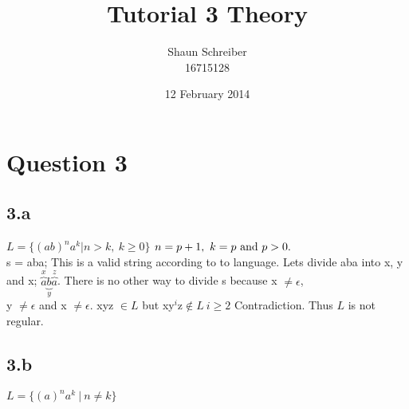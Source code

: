 \documentclass[a4paper, 12pt]{article}
\date{12 February 2014}
\author{Shaun Schreiber \\ 16715128}
\title{Tutorial 3 Theory}
\begin{document}
\maketitle

\section*{Question 3}
\subsection*{3.a}
$L = \{(ab)^{n}a^{k}| n > k,\ k\geq 0\}$
$\\ n = p + 1,\ k = p\ \mbox{and}\ p > 0.$\\
s = aba; This is a valid string according to to language. Lets divide aba into x, y and x;
$\overbrace{a}^{x}\underbrace{b}_{y}\overbrace{a}^{z}$. There is no other way to divide s because x $\neq \epsilon$,\\ y $\neq \epsilon$ and x $\neq \epsilon$. xyz $\in L$ but xy$^{i}\mbox{z} \not\in L\ i  \geq 2 $ Contradiction.
Thus $L$ is not regular.
\subsection*{3.b}
$L = \{(a)^{n}a^{k}\ |\ n\neq k\}$
\end{document}
